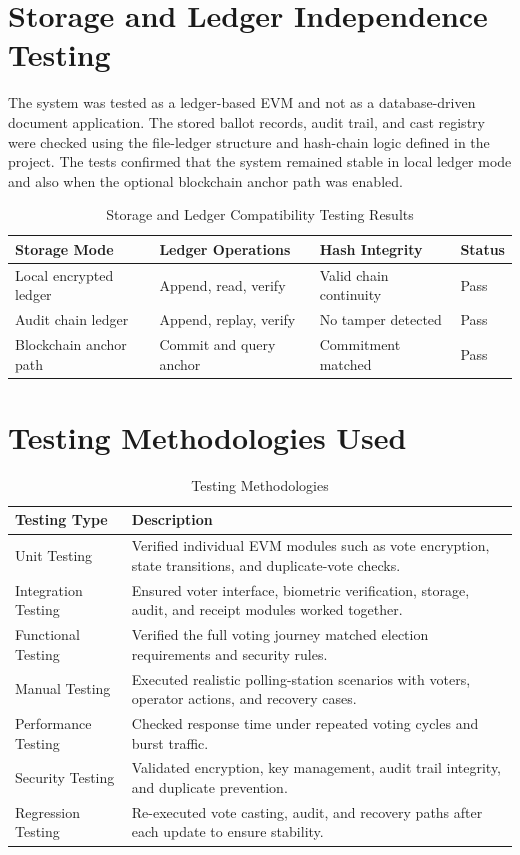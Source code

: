 \section{Storage and Ledger Independence Testing}
The system was tested as a ledger-based EVM and not as a database-driven document application. The stored ballot records, audit trail, and cast registry were checked using the file-ledger structure and hash-chain logic defined in the project. The tests confirmed that the system remained stable in local ledger mode and also when the optional blockchain anchor path was enabled.

\begin{table}[htbp]
\centering
\caption{Storage and Ledger Compatibility Testing Results}
\begin{tabular}{p{}|p{}|p{}|p{}}
\toprule
\textbf{Storage Mode} & \textbf{Ledger Operations} & \textbf{Hash Integrity} & \textbf{Status} \\
\midrule
Local encrypted ledger & Append, read, verify & Valid chain continuity & Pass \\
\midrule
Audit chain ledger & Append, replay, verify & No tamper detected & Pass \\
\midrule
Blockchain anchor path & Commit and query anchor & Commitment matched & Pass \\
\bottomrule
\end{tabular}
\end{table}

\section{Testing Methodologies Used}

\begin{table}[htbp]
\centering
\caption{Testing Methodologies}
\begin{tabular}{p{}|p{}}
\toprule
\textbf{Testing Type} & \textbf{Description} \\
\midrule
Unit Testing & Verified individual EVM modules such as vote encryption, state transitions, and duplicate-vote checks. \\
\midrule
Integration Testing & Ensured voter interface, biometric verification, storage, audit, and receipt modules worked together. \\
\midrule
Functional Testing & Verified the full voting journey matched election requirements and security rules. \\
\midrule
Manual Testing & Executed realistic polling-station scenarios with voters, operator actions, and recovery cases. \\
\midrule
Performance Testing & Checked response time under repeated voting cycles and burst traffic. \\
\midrule
Security Testing & Validated encryption, key management, audit trail integrity, and duplicate prevention. \\
\midrule
Regression Testing & Re-executed vote casting, audit, and recovery paths after each update to ensure stability. \\
\bottomrule
\end{tabular}
\end{table}

